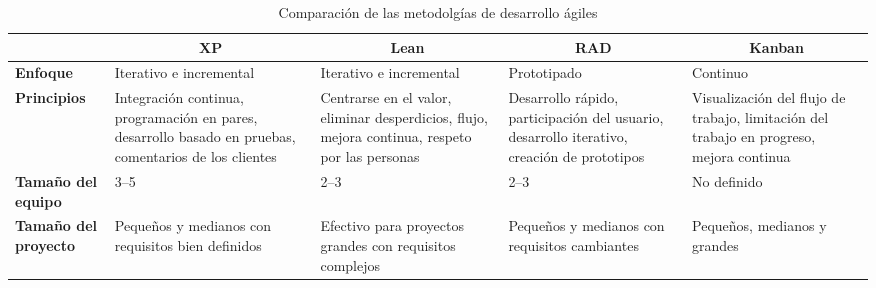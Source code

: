 \begin{spacing}{1}

    \begin{center}
        \renewcommand*{\arraystretch}{1.4}
        \begin{longtable}[l]{ |>{\bfseries}p{}| p{} |p{}  |p{} | p{}|}
            \caption[Comparación de las metodolgías de desarrollo ágiles]{ Comparación de las metodolgías de desarrollo ágiles\cite{barriga_sanchez_sistema_2023} }\label{tab:table_metodologias_agiles} \\
            \hline
            \multicolumn{1}{|c|}{ \textbf{Criterio}} & \multicolumn{1}{c|}{\textbf{XP}}                                                                        & \multicolumn{1}{c|}{ \textbf{Lean}} & \multicolumn{1}{c|}{ \textbf{RAD}}  & \multicolumn{1}{c|}{ \textbf{Kanban}}\\
            \hline
            Enfoque                                & Iterativo e incremental                                                                                & Iterativo e incremental                                                                        & Prototipado                                                                                & Continuo                                                                                \\
            \hline
            Principios                             & Integración continua, programación en pares, desarrollo basado en pruebas, comentarios de los clientes & Centrarse en el valor, eliminar desperdicios, flujo, mejora continua, respeto por las personas & Desarrollo rápido, participación del usuario, desarrollo iterativo, creación de prototipos & Visualización del flujo de trabajo, limitación del trabajo en progreso, mejora continua \\
            \hline
            Tamaño del equipo                      & 3--5                                                                                                   & 2--3                                                                                           & 2--3                                                                                       & No definido                                                                             \\
            \hline
            Tamaño del proyecto                    & Pequeños y medianos con requisitos bien definidos                                                      & Efectivo para proyectos grandes con requisitos complejos & Pequeños y medianos con requisitos cambiantes & Pequeños, medianos y grandes \\

\end{longtable}
\end{center}
\end{spacing}
